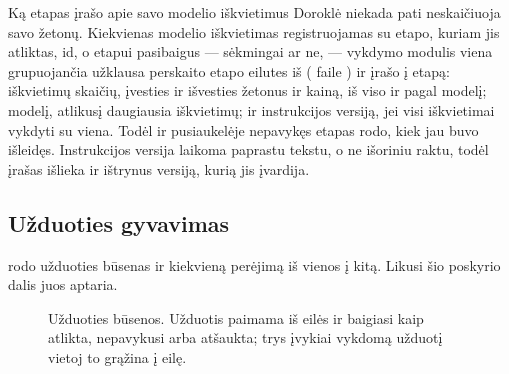 \begin{codebox}{Ką etapas įrašo apie savo modelio iškvietimus}
Doroklė niekada pati neskaičiuoja savo žetonų. Kiekvienas modelio iškvietimas
registruojamas su etapo, kuriam jis atliktas, id, o etapui pasibaigus --- sėkmingai ar ne,
--- vykdymo modulis viena grupuojančia užklausa perskaito etapo eilutes iš 
( faile ) ir įrašo į etapą: iškvietimų skaičių,
įvesties ir išvesties žetonus ir kainą, iš viso ir pagal modelį; modelį, atlikusį daugiausia
iškvietimų; ir instrukcijos versiją, jei visi iškvietimai vykdyti su viena. Todėl ir pusiaukelėje
nepavykęs etapas rodo, kiek jau buvo išleidęs. Instrukcijos versija laikoma paprastu tekstu, o
ne išoriniu raktu, todėl įrašas išlieka ir ištrynus versiją, kurią jis įvardija.
\end{codebox}

\subsection{Užduoties gyvavimas}

 rodo užduoties būsenas ir kiekvieną perėjimą iš vienos į kitą. Likusi
šio poskyrio dalis juos aptaria.

\begin{figure}[H]
\centering
{}
\caption{Užduoties būsenos. Užduotis paimama iš eilės ir baigiasi kaip atlikta, nepavykusi
  arba atšaukta; trys įvykiai vykdomą užduotį vietoj to grąžina į eilę.}\label{fig:arch:jobstates}
\end{figure}

